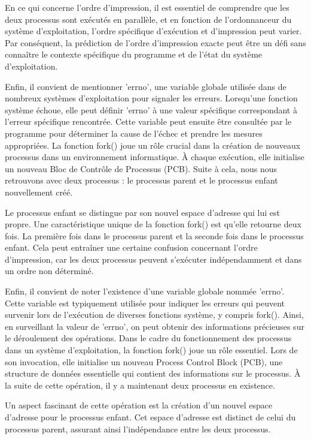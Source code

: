 \documentclass[12pt]{article}
\begin{document}
En ce qui concerne l'ordre d'impression, il est essentiel de comprendre que les deux processus sont exécutés en parallèle, et en fonction de l'ordonnanceur du système d'exploitation, l'ordre spécifique d'exécution et d'impression peut varier. Par conséquent, la prédiction de l'ordre d'impression exacte peut être un défi sans connaître le contexte spécifique du programme et de l'état du système d'exploitation.

Enfin, il convient de mentionner 'errno', une variable globale utilisée dans de nombreux systèmes d'exploitation pour signaler les erreurs. Lorsqu'une fonction système échoue, elle peut définir 'errno' à une valeur spécifique correspondant à l'erreur spécifique rencontrée. Cette variable peut ensuite être consultée par le programme pour déterminer la cause de l'échec et prendre les mesures appropriées.
La fonction fork() joue un rôle crucial dans la création de nouveaux processus dans un environnement informatique. À chaque exécution, elle initialise un nouveau Bloc de Contrôle de Processus (PCB). Suite à cela, nous nous retrouvons avec deux processus : le processus parent et le processus enfant nouvellement créé. 

Le processus enfant se distingue par son nouvel espace d'adresse qui lui est propre. Une caractéristique unique de la fonction fork() est qu'elle retourne deux fois. La première fois dans le processus parent et la seconde fois dans le processus enfant. Cela peut entraîner une certaine confusion concernant l'ordre d'impression, car les deux processus peuvent s'exécuter indépendamment et dans un ordre non déterminé.

Enfin, il convient de noter l'existence d'une variable globale nommée 'errno'. Cette variable est typiquement utilisée pour indiquer les erreurs qui peuvent survenir lors de l'exécution de diverses fonctions système, y compris fork(). Ainsi, en surveillant la valeur de 'errno', on peut obtenir des informations précieuses sur le déroulement des opérations.
Dans le cadre du fonctionnement des processus dans un système d'exploitation, la fonction fork() joue un rôle essentiel. Lors de son invocation, elle initialise un nouveau Process Control Block (PCB), une structure de données essentielle qui contient des informations sur le processus. À la suite de cette opération, il y a maintenant deux processus en existence.

Un aspect fascinant de cette opération est la création d'un nouvel espace d'adresse pour le processus enfant. Cet espace d'adresse est distinct de celui du processus parent, assurant ainsi l'indépendance entre les deux processus.
\end{document}
